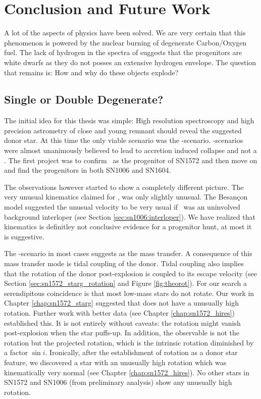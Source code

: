 \chapter{Conclusion and Future Work}
\label{chap:four}

A lot of the aspects of \snia physics have been solved. We are very certain that this phenomenon is powered by the nuclear burning of degenerate Carbon/Oxygen fuel. The lack of hydrogen in the spectra of \sneia suggests that the progenitors are white dwarfs as they do not posses an extensive hydrogen envelope. The question that remains is: How and why do these objects explode?

\section{Single or Double Degenerate?}

The initial idea for this thesis was simple: High resolution spectroscopy and high precision astrometry of close and young remnant should reveal the suggested donor star. At this time the only viable scenario was the \sd-scenario. \dd-scenarios were almost unanimously believed to lead to accretion induced collapse and not a \snia. The first project was to confirm \starg\ as the progenitor of SN1572 and then move on and find the progenitors in both SN1006 and SN1604. 

The observations however started to show a completely different picture. The very unusual kinematics claimed for \starg \citep{2004Natur.431.1069R}, was only slightly unusual. The Besan\c{c}on model suggested the unusual velocity to be very usual if \starg\ was an uninvolved background interloper (see Section \ref{sec:sn1006:interloper}). We have realized that kinematics is definitley not conclusive evidence for a progenitor hunt, at most it is suggestive. 

The \sd-scenario in most cases suggests \rlof as the mass transfer. A consequence of this mass transfer mode is tidal coupling of the donor. Tidal coupling also implies that the rotation of the donor post-explosion is coupled to its escape velocity (see Section \ref{sec:sn1572_starg_rotation} and Figure \ref{fig:theorot}). For our search a serendipitous coincidence is that most low-mass stars do not rotate. Our work in Chapter \ref{chap:sn1572_starg} suggested that \starg does not have a unusually high rotation. Further work with better data (see Chapter \ref{chap:sn1572_hires}) established this. It is not entirely without caveats: the rotation might vanish post-explosion when the star puffs-up. In addition, the observable is not the rotation but the projected rotation, which is the intrinsic rotation diminished by a factor $\sin{i}$. Ironically, after the establishment of rotation as a donor star feature, we discovered a star with an unusually high rotation which was kinematically very normal (see Chapter \ref{chap:sn1572_hires}). No other stars in SN1572 and SN1006 (from preliminary analysis) show any unusually high rotation. 

